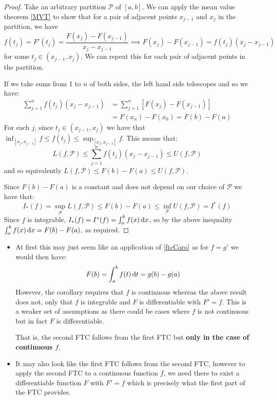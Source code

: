 \documentclass[../main.tex]{subfiles}
\begin{document}
\begin{proof}
  Take an arbitrary partition $\mathcal{P}$ of $[a, b]$.
  We can apply the mean value theorem \cref{MVT} to show that for a pair of adjacent points $x_{j - 1}$ and $x_{j}$ in the partition, we have
  \[
    f(t_j) = F'(t_j) = \frac{F(x_j) - F(x_{j - 1})}{x_j - x_{j - 1}} \implies F(x_j) - F(x_{j - 1}) = f(t_j) (x_j - x_{j - 1})
  \]
  for some $t_j \in (x_{j - 1}, x_j)$.
  We can repeat this for each pair of adjacent points in the partition.

  If we take sums from 1 to $n$ of both sides, the left hand side telescopes and so we have:
  \begin{align*}
    \sum_{j = 1}^{n} f(t_j)(x_j - x_{j - 1}) &= \sum_{j = 1}^{n} [F(x_j) - F(x_{j - 1})] \\
                                             &= F(x_n) - F(x_0) = F(b) - F(a)
  \end{align*}
  For each $j$, since $t_j \in (x_{j - 1}, x_j)$ we have that $\inf_{[x_j, x_{j - 1}]} f \leq f(t_j) \leq \sup_{[x_j, x_{j - 1}]} f$.
  This means that:
  \[
    L(f, \mathcal{P}) \leq \sum_{j = 1}^{n} f(t_j)(x_j - x_{j - 1}) \leq U(f, \mathcal{P})
  \]
  and so equivalently $L(f, \mathcal{P}) \leq F(b) - F(a) \leq U(f, \mathcal{P})$.

  Since $F(b) - F(a)$ is a constant and does not depend on our choice of $\mathcal{P}$ we have that:
  \[
    I_{*}(f) = \sup_{\mathcal{P}} L(f, \mathcal{P}) \leq F(b) - F(a) \leq \inf_{\mathcal{P}} U(f, \mathcal{P}) = I^{*}(f)
  \]
  Since $f$ is integrable, $I_{*}(f) = I^{*}(f) = \int_{a}^{b} f(x) \d{x}$, so by the above inequality $\int_{a}^{b} f(x) \d{x} = F(b) - F(a)$, as required.
\end{proof}
\begin{remark}
  \begin{itemize}
    \item At first this may just seem like an application of \cref{ftcCoro} as  for $f = g'$ we would then have:
      \[
        F(b) = \int_{a}^{b} f(t) \d{t} = g(b) - g(a)
      \]
      However, the corollary requires that $f$ is continuous whereas the above result does not, only that $f$ is integrable and $F$ is differentiable with $F' = f$.
      This is a weaker set of assumptions as there could be cases where $f$ is not continuous but in fact $F$ is differentiable.

      That is, the second FTC follows from the first FTC but \textbf{only in the case of continuous $f$}.
    \item It may also look like the first FTC follows from the second FTC, however to apply the second FTC to a continuous function $f$, we need there to exist a differentiable function $F$ with $F' = f$ which is precisely what the first part of the FTC provides.
  \end{itemize}
\end{remark}
\end{document}
